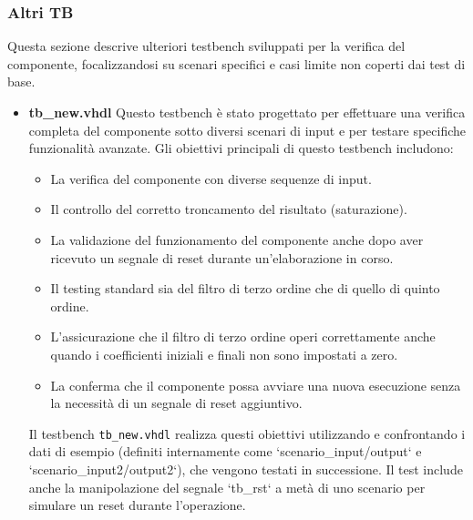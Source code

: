 \documentclass{article}
\begin{document}
\subsubsection{Altri TB}
Questa sezione descrive ulteriori testbench sviluppati per la verifica del componente, focalizzandosi su scenari specifici e casi limite non coperti dai test di base.

\begin{itemize}
    \item \textbf{tb\_new.vhdl}
    Questo testbench è stato progettato per effettuare una verifica completa del componente sotto diversi scenari di input e per testare specifiche funzionalità avanzate. Gli obiettivi principali di questo testbench includono:
    \begin{itemize}
        \item La verifica del componente con diverse sequenze di input.
        \item Il controllo del corretto troncamento del risultato (saturazione).
        \item La validazione del funzionamento del componente anche dopo aver ricevuto un segnale di reset durante un'elaborazione in corso.
        \item Il testing standard sia del filtro di terzo ordine che di quello di quinto ordine.
        \item L'assicurazione che il filtro di terzo ordine operi correttamente anche quando i coefficienti iniziali e finali non sono impostati a zero.
        \item La conferma che il componente possa avviare una nuova esecuzione senza la necessità di un segnale di reset aggiuntivo.
    \end{itemize}
    Il testbench \texttt{tb\_new.vhdl} realizza questi obiettivi utilizzando e confrontando i dati di esempio (definiti internamente come `scenario\_input/output` e `scenario\_input2/output2`), che vengono testati in successione. Il test include anche la manipolazione del segnale `tb\_rst` a metà di uno scenario per simulare un reset durante l'operazione.



\end{itemize}
\end{document}
